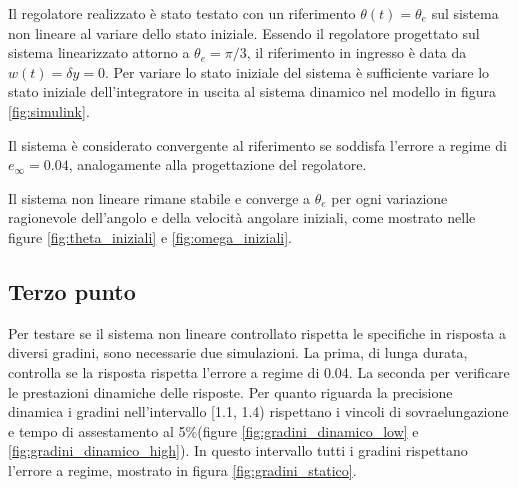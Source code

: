 \documentclass[a4paper, 11pt]{article}
\begin{document}
Il regolatore realizzato è stato testato con un riferimento $\theta(t)=\theta_e$ sul sistema non lineare al variare dello stato iniziale. Essendo il regolatore progettato sul sistema linearizzato attorno a $\theta_e=\pi/3$, il riferimento in ingresso è data da $w(t)=\delta y=0$. Per variare lo stato iniziale del sistema è sufficiente variare lo stato iniziale dell'integratore in uscita al sistema dinamico nel modello in figura \ref{fig:simulink}.

Il sistema è considerato convergente al riferimento se soddisfa l'errore a regime di $e_{\infty} = 0.04$, analogamente alla progettazione del regolatore.

Il sistema non lineare rimane stabile e converge a $\theta_e$ per ogni variazione ragionevole dell'angolo e della velocità angolare iniziali, come mostrato nelle figure \ref{fig:theta_iniziali} e \ref{fig:omega_iniziali}.



\subsection{Terzo punto}

Per testare se il sistema non lineare controllato rispetta le specifiche in risposta a diversi gradini, sono necessarie due simulazioni. La prima, di lunga durata, controlla se la risposta rispetta l'errore a regime di 0.04. La seconda per verificare le prestazioni dinamiche delle risposte.
Per quanto riguarda la precisione dinamica i gradini nell'intervallo [1.1, 1.4) rispettano i vincoli di sovraelungazione e tempo di assestamento al 5\%(figure \ref{fig:gradini_dinamico_low} e \ref{fig:gradini_dinamico_high}).
In questo intervallo tutti i gradini rispettano l'errore a regime, mostrato in figura \ref{fig:gradini_statico}.
\end{document}
